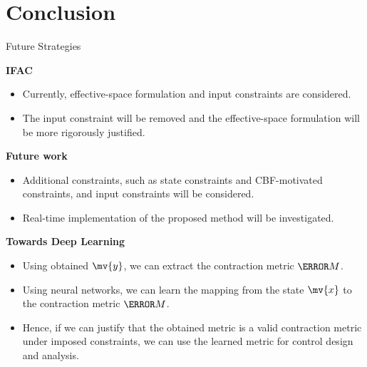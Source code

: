\section{Conclusion}

\begin{frame}{Future Strategies}{}

    \textbf{IFAC}

    \begin{itemize}
        \item Currently, effective-space formulation and input constraints are considered.
        \item The input constraint will be removed and the effective-space formulation will be more rigorously justified.
    \end{itemize}

    \textbf{Future work}

    \begin{itemize}
        \item Additional constraints, such as state constraints and CBF-motivated constraints, and input constraints will be considered.
        \item Real-time implementation of the proposed method will be investigated.
    \end{itemize}

    \textbf{Towards Deep Learning}

    \begin{itemize}
        \item Using obtained $\mv{y}$, we can extract the contraction metric $\mm{M}$.
        \item Using neural networks, we can learn the mapping from the state $\mv{x}$ to the contraction metric $\mm{M}$.
        \item Hence, if we can justify that the obtained metric is a valid contraction metric under imposed constraints, we can use the learned metric for control design and analysis.
    \end{itemize}
    
\end{frame}